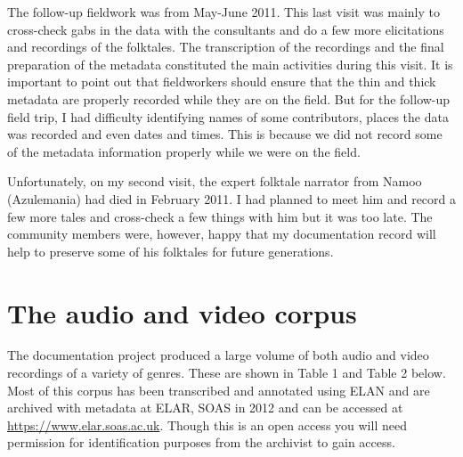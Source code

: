 \documentclass[output=paper,colorlinks,citecolor=brown]{langscibook}
\begin{document}
The follow-up fieldwork was from May-June 2011. This last visit was mainly to cross-check gabs in the data with the consultants and do a few more elicitations and recordings of the folktales. The transcription of the recordings and the final preparation of the metadata constituted the main activities during this visit. It is important to point out that fieldworkers should ensure that the thin and thick metadata are properly recorded while they are on the field. But for the follow-up field trip, I had difficulty identifying names of some contributors, places the data was recorded and even dates and times. This is because we did not record some of the metadata information properly while we were on the field.

Unfortunately, on my second visit, the expert folktale narrator from Namoo (Azulemania) had died in February 2011. I had planned to meet him and record a few more tales and cross-check a few things with him but it was too late. The community members were, however, happy that my documentation record will help to preserve some of his folktales for future generations.


\section{The audio and video corpus}
The documentation project produced a large volume of both audio and video recordings of a variety of genres. These are shown in Table 1 and Table 2 below. Most of this corpus has been transcribed and annotated using ELAN and are archived with metadata at ELAR, SOAS in 2012 and can be accessed at \url{https://www.elar.soas.ac.uk}. Though this is an open access you will need permission for identification purposes from the archivist to gain access.
\end{document}
